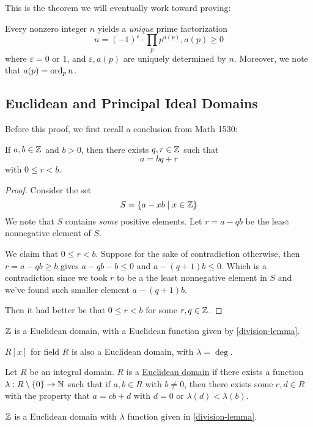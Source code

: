 This is the theorem we will eventually work toward proving:

\begin{theorem}\label{unique-factorization}
    Every nonzero integer $n$ yields a \emph{unique} prime factorization
    \begin{equation*}
        n = (-1)^\varepsilon\cdot \prod_{p}p^{a(p)}, a(p)\geq 0
    \end{equation*}
    where $\varepsilon = 0$ or $1$, and $\varepsilon, a(p)$ are uniquely determined by $n$. Moreover, we note that $a(p) = \operatorname{ord}_p n$.
\end{theorem}

\subsection{Euclidean and Principal Ideal Domains}
Before this proof, we first recall a conclusion from Math 1530:
\begin{lemma}\label{division-lemma}
    If $a, b\in \mathbb Z$ and $b>0$, then there exists $q, r\in \mathbb Z$ such that
    \[a = bq + r\]
    with $0\leq r < b$.
\end{lemma}
\begin{proof}
    Consider the set
    \[S = \{a - xb \mid x\in \mathbb Z\}\]
    We note that $S$ contains \emph{some} positive elements. Let $r = a - qb$ be the least nonnegative element of $S$.

    We claim that $0\leq r < b$. Suppose for the sake of contradiction otherwise, then $r = a - qb \geq b$ gives $a - qb - b \leq 0$ and $a - (q+1)b\leq 0$. Which is a contradiction since we took $r$ to be a the least nonnegative element in $S$ and we've found such smaller element $a - (q+1)b$.

    Then it had better be that $0\leq r < b$ for some $r, q\in\mathbb Z$.
\end{proof}
\begin{corollary}
    $\mathbb Z$ is a Euclidean domain, with a Euclidean function given by \cref{division-lemma}.

    $R[x]$ for field $R$ is also a Euclidean domain, with $\lambda = \deg$.
\end{corollary}

\begin{definition}
    Let $R$ be an integral domain. $R$ is a \ul{Euclidean domain} if there exists a function $\lambda: R\setminus \{0\} \to \mathbb N$ such that if $a, b\in R$ with $b\neq 0$, then there exists some $c, d\in R$ with the property that $a = cb + d$ with $d=0$ or $\lambda(d) < \lambda(b)$.
\end{definition}
\begin{example}
    $\mathbb Z$ is a Euclidean domain with $\lambda$ function given in \cref{division-lemma}.
\end{example}

